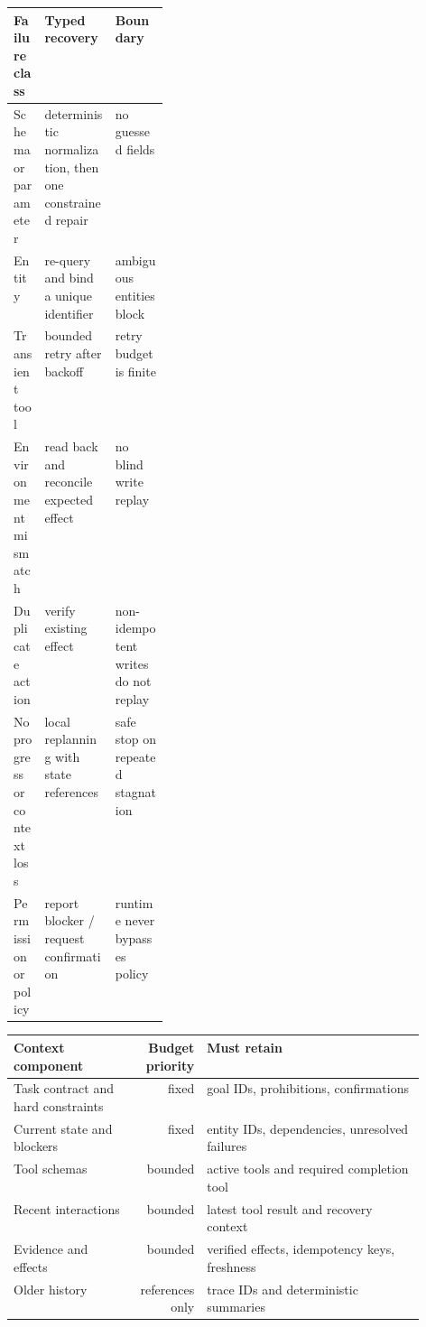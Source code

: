 \begin{center}
\small
\begin{tabularx}{0.94\linewidth}{@{}p{0.20\linewidth}YY@{}}
\toprule
Failure class & Typed recovery & Boundary \\
\midrule
Schema or parameter & deterministic normalization, then one constrained repair & no guessed fields \\
Entity & re-query and bind a unique identifier & ambiguous entities block \\
Transient tool & bounded retry after backoff & retry budget is finite \\
Environment mismatch & read back and reconcile expected effect & no blind write replay \\
Duplicate action & verify existing effect & non-idempotent writes do not replay \\
No progress or context loss & local replanning with state references & safe stop on repeated stagnation \\
Permission or policy & report blocker / request confirmation & runtime never bypasses policy \\
\bottomrule
\end{tabularx}
\end{center}

\begin{center}
\small
\begin{tabular}{@{}lrp{0.53\linewidth}@{}}
\toprule
Context component & Budget priority & Must retain \\
\midrule
Task contract and hard constraints & fixed & goal IDs, prohibitions, confirmations \\
Current state and blockers & fixed & entity IDs, dependencies, unresolved failures \\
Tool schemas & bounded & active tools and required completion tool \\
Recent interactions & bounded & latest tool result and recovery context \\
Evidence and effects & bounded & verified effects, idempotency keys, freshness \\
Older history & references only & trace IDs and deterministic summaries \\
\bottomrule
\end{tabular}
\end{center}


